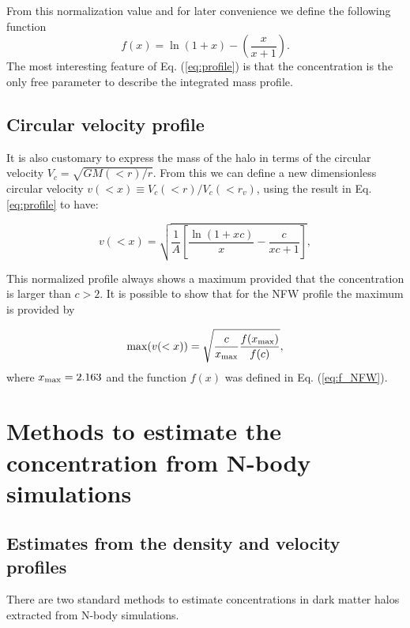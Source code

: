 \documentclass[a4,useAMS,usenatbib,usegraphicx]{mn2e}
\begin{document}
From this normalization value and for later convenience we define the
following function
%
\begin{equation}
f(x) = \ln\left(1+x\right)-\left(\frac{x}{x+1}\right).
\label{eq:f_NFW}
\end{equation}
%
The most interesting feature of Eq. (\ref{eq:profile}) is that the
concentration is the only free parameter to describe the integrated
mass profile.


 
\subsection{Circular velocity profile}

It is also customary to express the mass of the halo in terms of the
circular velocity $V_{c}=\sqrt{GM(<r)/r}$.
From this we can define a new dimensionless circular velocity $v(<x)\equiv
V_{c}(<r)/V_{c}(<r_v)$, using the result in Eq. \ref{eq:profile}
to have:

\begin{equation}
v(<x)=\sqrt{\frac{1}{A}\left[\frac{\ln\left(1+xc\right)}{x}-\frac{c}{xc+1}\right]},
\end{equation}


This normalized profile always shows a maximum provided that the
concentration is larger than $c>2$.
It is possible to show that for the NFW profile the maximum is
provided by

\begin{equation}
\mathrm{max}(v(<x)) = \sqrt{\frac{c}{x_{\rm max}}\frac{f(x_{\rm
      max})}{f(c)}},
\label{eq:max_v}
\end{equation}
where $x_{\rm max}=2.163$ \citep{Klypin2014} and the function $f(x)$
was defined in Eq. (\ref{eq:f_NFW}).

\section{Methods to estimate the concentration from N-body simulations}
\label{sec:method}

\subsection{Estimates from the density and velocity profiles}
There are two standard methods to estimate concentrations in dark matter
halos extracted from N-body simulations.
\end{document}
